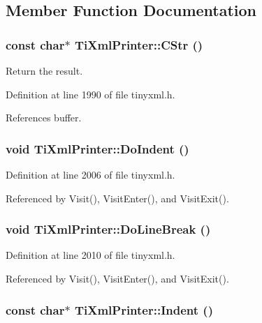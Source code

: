 \subsection{Member Function Documentation}
\hypertarget{class_ti_xml_printer_a859eede9597d3e0355b77757be48735e}{
\subsubsection[{CStr}]{\setlength{\rightskip}{0pt plus 5cm}const char$\ast$ TiXmlPrinter::CStr ()}}
\label{class_ti_xml_printer_a859eede9597d3e0355b77757be48735e}


Return the result. 

Definition at line 1990 of file tinyxml.h.

References buffer.\hypertarget{class_ti_xml_printer_a348ad6527b1d43ddeb51454cddeb6a1d}{
\subsubsection[{DoIndent}]{\setlength{\rightskip}{0pt plus 5cm}void TiXmlPrinter::DoIndent ()}}
\label{class_ti_xml_printer_a348ad6527b1d43ddeb51454cddeb6a1d}


Definition at line 2006 of file tinyxml.h.

Referenced by Visit(), VisitEnter(), and VisitExit().\hypertarget{class_ti_xml_printer_a252a0e13e06def9a06b2eb30a04677a0}{
\subsubsection[{DoLineBreak}]{\setlength{\rightskip}{0pt plus 5cm}void TiXmlPrinter::DoLineBreak ()}}
\label{class_ti_xml_printer_a252a0e13e06def9a06b2eb30a04677a0}


Definition at line 2010 of file tinyxml.h.

Referenced by Visit(), VisitEnter(), and VisitExit().\hypertarget{class_ti_xml_printer_abb33ec7d4bad6aaeb57f4304394b133d}{
\subsubsection[{Indent}]{\setlength{\rightskip}{0pt plus 5cm}const char$\ast$ TiXmlPrinter::Indent ()}}
\label{class_ti_xml_printer_abb33ec7d4bad6aaeb57f4304394b133d}


